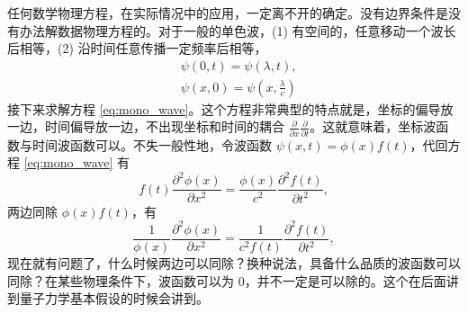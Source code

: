 任何数学物理方程，在实际情况中的应用，一定离不开的确定。没有边界条件是没有办法解数据物理方程的。对于一般的单色波，(1) 有空间的，任意移动一个波长后相等，(2) 沿时间任意传播一定频率后相等，
\begin{align}
    &\psi(0,t) = \psi(\lambda, t), \label{eq:mono_wave_periodical}\\
    &\psi(x,0) = \psi\left(x,\tfrac\lambda{c}\right) \label{eq:mono_wave_freq}
\end{align}
接下来求解方程 \eqref{eq:mono_wave}。这个方程非常典型的特点就是，坐标的偏导放一边，时间偏导放一边，不出现坐标和时间的耦合 $\frac{\partial}{\partial x}\frac{\partial}{\partial t}$。这就意味着，坐标波函数与时间波函数可以。不失一般性地，令波函数 $\psi (x,t) = \phi(x) f(t)$，代回方程 \eqref{eq:mono_wave} 有
\begin{equation}
    f(t) \frac{\partial^2 \phi(x)}{\partial x^2} = \frac{\phi(x)}{c^2} \frac{\partial^2 f(t)}{\partial t^2},
\end{equation}
两边同除 $\phi(x) f(t)$，有
\begin{equation}
    \frac1{\phi(x)} \frac{\partial^2 \phi(x)}{\partial x^2} = \frac{1}{c^2 f(t)} \frac{\partial^2 f(t)}{\partial t^2},
\end{equation}
现在就有问题了，什么时候两边可以同除？换种说法，具备什么品质的波函数可以同除？在某些物理条件下，波函数可以为 0，并不一定是可以除的。这个在后面讲到量子力学基本假设的时候会讲到。


